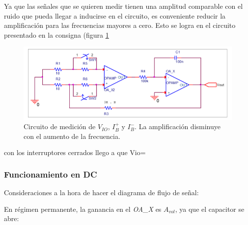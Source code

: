 \documentclass[../../main.tex]{subfiles}
\begin{document}
Ya que las se\~nales que se quieren medir tienen una amplitud comparable con el ruido que pueda llegar a inducirse en el circuito, es conveniente reducir la amplificaci\'on para las frecuencias mayores a cero.  Esto se logra en el circuito presentado en la consigna (figura \ref{fig:ej_3_medicion_vio_consigna}

\begin{figure}[htb] %
	\centering
	\includegraphics[scale=1]{imagenes/medicion_bias_configuracion_consigna.png}
	\caption{Circuito de medici\'on de $V_{IO}$, $I_B^+$ y $I_B^-$. La amplificaci\'on disminuye con el aumento de la frecuencia.}
	\label{fig:ej_3_medicion_vio_consigna}
\end{figure}


con los interruptores cerrados llego a que Vio=

\subsubsection{Funcionamiento en DC}

Consideraciones a la hora de hacer el diagrama de flujo de se\~nal:
En r\'egimen permanente, la ganancia en el \textit{OA\_X} es $A_{vol}$, ya que el capacitor se abre: 
\end{document}
